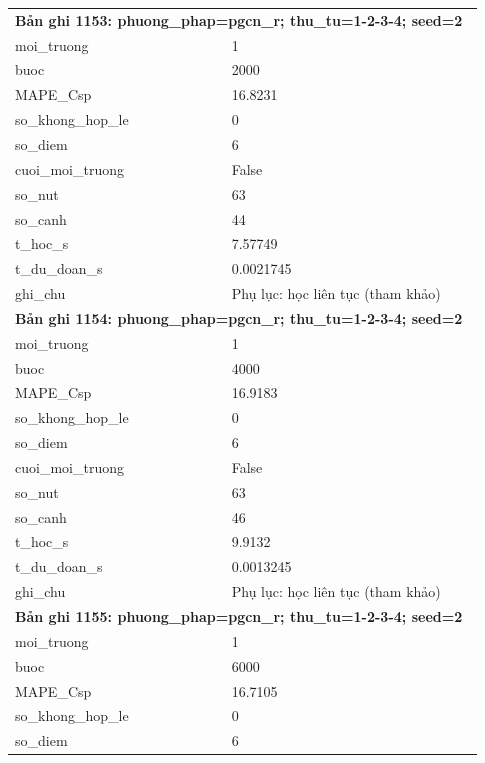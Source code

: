\begin{longtable}{p{0.43\linewidth}p{0.50\linewidth}}
\midrule
\multicolumn{2}{p{0.95\linewidth}}{\textbf{Bản ghi 1153: phuong\_phap=pgcn\_r; thu\_tu=1-2-3-4; seed=2}} \\
moi\_\allowbreak truong & 1 \\
buoc & 2000 \\
MAPE\_\allowbreak Csp & 16.8231 \\
so\_\allowbreak khong\_\allowbreak hop\_\allowbreak le & 0 \\
so\_\allowbreak diem & 6 \\
cuoi\_\allowbreak moi\_\allowbreak truong & False \\
so\_\allowbreak nut & 63 \\
so\_\allowbreak canh & 44 \\
t\_\allowbreak hoc\_\allowbreak s & 7.57749 \\
t\_\allowbreak du\_\allowbreak doan\_\allowbreak s & 0.0021745 \\
ghi\_\allowbreak chu & Phụ lục: học liên tục (tham khảo) \\
\midrule
\multicolumn{2}{p{0.95\linewidth}}{\textbf{Bản ghi 1154: phuong\_phap=pgcn\_r; thu\_tu=1-2-3-4; seed=2}} \\
moi\_\allowbreak truong & 1 \\
buoc & 4000 \\
MAPE\_\allowbreak Csp & 16.9183 \\
so\_\allowbreak khong\_\allowbreak hop\_\allowbreak le & 0 \\
so\_\allowbreak diem & 6 \\
cuoi\_\allowbreak moi\_\allowbreak truong & False \\
so\_\allowbreak nut & 63 \\
so\_\allowbreak canh & 46 \\
t\_\allowbreak hoc\_\allowbreak s & 9.9132 \\
t\_\allowbreak du\_\allowbreak doan\_\allowbreak s & 0.0013245 \\
ghi\_\allowbreak chu & Phụ lục: học liên tục (tham khảo) \\
\midrule
\multicolumn{2}{p{0.95\linewidth}}{\textbf{Bản ghi 1155: phuong\_phap=pgcn\_r; thu\_tu=1-2-3-4; seed=2}} \\
moi\_\allowbreak truong & 1 \\
buoc & 6000 \\
MAPE\_\allowbreak Csp & 16.7105 \\
so\_\allowbreak khong\_\allowbreak hop\_\allowbreak le & 0 \\
so\_\allowbreak diem & 6 \\

\end{longtable}
